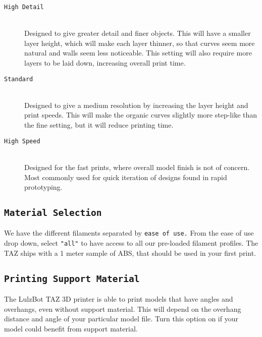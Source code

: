 \begin{description}
\item[\texttt{High Detail}] \hfill \\
Designed to give greater detail and finer objects. This will have a smaller layer height, which will make each layer thinner, so that curves seem more natural and walls seem less noticeable. This setting will also require more layers to be laid down, increasing overall print time.

\item[\texttt{Standard}] \hfill \\
Designed to give a medium resolution by increasing the layer height and print speeds. This will make the organic curves slightly more step-like than the fine setting, but it will reduce printing time.

\item[\texttt{High Speed}] \hfill \\
Designed for the fast prints, where overall model finish is not of concern. Most commonly used for quick iteration of designs found in rapid prototyping.
\end{description}

\subsection{\texttt{Material Selection}}
We have the different filaments separated by \texttt{ease of use.} From the ease of use drop down, select \texttt{"all"} to have access to all our pre-loaded filament profiles. The TAZ ships with a 1 meter sample of ABS, that should be used in your first print.

\subsection{\texttt{Printing Support Material}}
The LulzBot\textsuperscript{\miniscule{\texttrademark}} TAZ 3D printer is able to print models that have angles and overhangs, even without support material. This will depend on the overhang distance and angle of your particular model file. Turn this option on if your model could benefit from support material.

